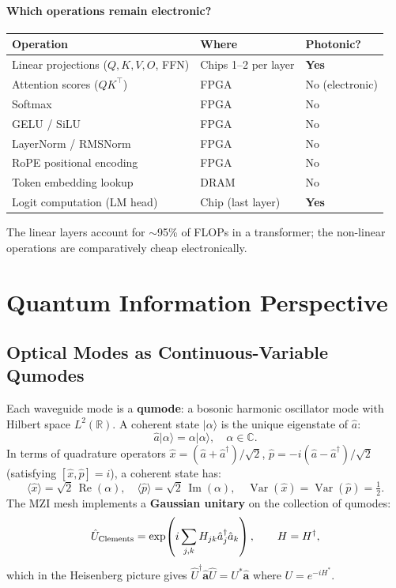 \documentclass[12pt, a4paper]{article}
\newcommand{\CC}{\mathbb{C}}
\newcommand{\RR}{\mathbb{R}}
\begin{document}
\paragraph{Which operations remain electronic?}
\begin{center}
\begin{tabular}{lll}
\toprule
\textbf{Operation} & \textbf{Where} & \textbf{Photonic?} \\
\midrule
Linear projections ($Q,K,V,O$, FFN) & Chips 1--2 per layer & \textbf{Yes} \\
Attention scores ($QK^\top$) & FPGA & No (electronic) \\
Softmax & FPGA & No \\
GELU / SiLU & FPGA & No \\
LayerNorm / RMSNorm & FPGA & No \\
RoPE positional encoding & FPGA & No \\
Token embedding lookup & DRAM & No \\
Logit computation (LM head) & Chip (last layer) & \textbf{Yes} \\
\bottomrule
\end{tabular}
\end{center}
The linear layers account for $\sim$95\% of FLOPs in a transformer;
the non-linear operations are comparatively cheap electronically.

\section{Quantum Information Perspective}
\label{sec:quantum_info}

\subsection{Optical Modes as Continuous-Variable Qumodes}

Each waveguide mode is a \textbf{qumode}: a bosonic harmonic oscillator mode
with Hilbert space $L^2(\RR)$.
A coherent state $|\alpha\rangle$ is the unique eigenstate of $\hat{a}$:
\begin{equation}
  \hat{a}|\alpha\rangle = \alpha|\alpha\rangle, \quad \alpha\in\CC.
\end{equation}
In terms of quadrature operators
$\hat{x} = (\hat{a}+\hat{a}^\dagger)/\sqrt{2}$,
$\hat{p} = -i(\hat{a}-\hat{a}^\dagger)/\sqrt{2}$
(satisfying $[\hat{x},\hat{p}]=i$), a coherent state has:
\begin{equation}
  \langle\hat{x}\rangle = \sqrt{2}\,\operatorname{Re}(\alpha), \quad
  \langle\hat{p}\rangle = \sqrt{2}\,\operatorname{Im}(\alpha), \quad
  \operatorname{Var}(\hat{x}) = \operatorname{Var}(\hat{p}) = \tfrac{1}{2}.
\end{equation}
The MZI mesh implements a \textbf{Gaussian unitary} on the collection of
qumodes:
\begin{equation}
  \hat{U}_{\rm Clements} = \exp\!\left(i\sum_{j,k} H_{jk}\hat{a}_j^\dagger\hat{a}_k\right),
  \qquad H = H^\dagger,
  \label{eq:gaussian_unitary}
\end{equation}
which in the Heisenberg picture gives
$\hat{U}^\dagger\hat{\mathbf{a}}\hat{U} = U^*\hat{\mathbf{a}}$
where $U = e^{-iH^*}$.
\end{document}
